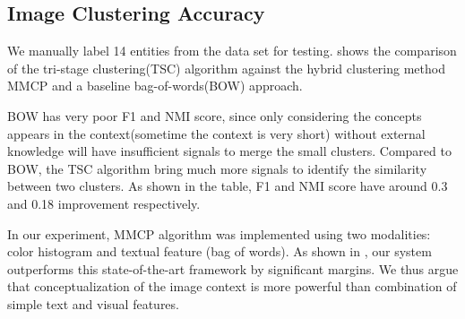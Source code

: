 \subsection{Image Clustering Accuracy}
We manually label 14 entities from the data set for testing.
 shows the comparison of
the tri-stage clustering(TSC) algorithm against the hybrid clustering method
MMCP \cite{Fu2011} and
a baseline bag-of-words(BOW) approach.

BOW has very poor F1 and NMI score, since only considering the
concepts appears in
the context(sometime the context is very short) without external knowledge will have insufficient signals
to merge the small clusters. Compared to BOW, the TSC algorithm bring
much more signals to identify the similarity between two clusters.
As shown in the table, F1 and NMI score have around 0.3 and 0.18 improvement respectively.

In our experiment, MMCP algorithm was implemented using two modalities: color histogram and
textual feature (bag of words). As shown in ,
our system outperforms this state-of-the-art framework by significant
margins. We thus argue that conceptualization of the image context
is more powerful than combination of simple text and visual features.

